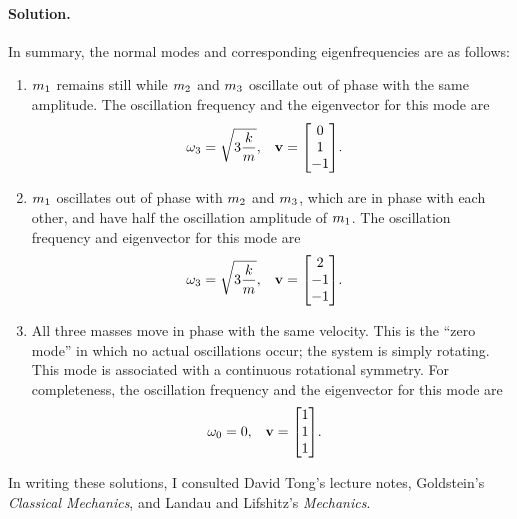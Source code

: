 \documentclass[11pt]{article}
\newenvironment{solution}
{
    \paragraph{Solution.}
    \ignorespaces
}
{
    \bigskip
}
\begin{document}
\begin{solution}
	In summary, the normal modes and corresponding eigenfrequencies are as follows:
	\renewcommand{\theenumi}{\alph{enumi}}
	\begin{enumerate}
		\item $m_1$ remains still while $m_2$ and $m_3$ oscillate out of phase with the same amplitude.  The oscillation frequency and the eigenvector for this mode are
			\begin{align}
				\ome &= \sqrt{3 \frac{k}{m}}, & \vv &= \mqty[0 \\ 1 \\ -1].
			\end{align}
		\item $m_1$ oscillates out of phase with $m_2$ and $m_3$, which are in phase with each other, and have half the oscillation amplitude of $m_1$.  The oscillation frequency and eigenvector for this mode are
			\begin{align}
				\ome &= \sqrt{3 \frac{k}{m}}, & \vv &= \mqty[2 \\ -1 \\ -1].
			\end{align}
		\item All three masses move in phase with the same velocity.  This is the ``zero mode'' in which no actual oscillations occur; the system is simply rotating.  This mode is associated with a continuous rotational symmetry.  For completeness, the oscillation frequency and the eigenvector for this mode are
			\begin{align}
				\omo &= 0, & \vv &= \mqty[1 \\ 1 \\ 1].
			\end{align}
	\end{enumerate}
\end{solution}

In writing these solutions, I consulted David Tong's lecture notes, Goldstein's \emph{Classical Mechanics}, and Landau and Lifshitz's \emph{Mechanics}.
\end{document}
